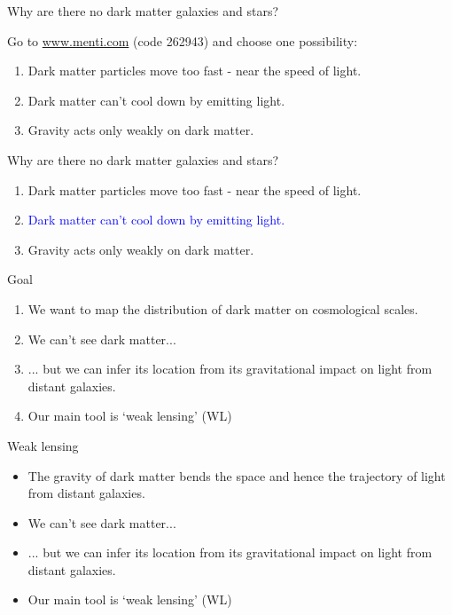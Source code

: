 \documentclass[usenames,dvipsnames]{beamer}
\newcommand{\mentiurl}[0]{{\url{www.menti.com}}}
\newcommand{\menticode}[0]{{262943}}
\newcommand{\correctanswer}[1]{\textcolor{blue}{{#1} \checkmark}}
\begin{document}
\begin{frame}{Why are there no dark matter galaxies and stars?}
  \begin{block}{}
    Go to \mentiurl{} (code \menticode{}) and choose one possibility:\\
    \begin{enumerate}
      \item{Dark matter particles move too fast - near the speed of light.}
      \item{Dark matter can't cool down by emitting light.}
      \item{Gravity acts only weakly on dark matter.}
    \end{enumerate}
  \end{block}
\end{frame}


\begin{frame}{Why are there no dark matter galaxies and stars?}
  \begin{block}{}
    \begin{enumerate}
      \item{Dark matter particles move too fast - near the speed of light.}
      \item{\correctanswer{Dark matter can't cool down by emitting light.}}
      \item{Gravity acts only weakly on dark matter.}
    \end{enumerate}
  \end{block}
\end{frame}

\begin{frame}{Goal}
  \begin{block}{}
    \begin{enumerate}
      \item{We want to map the distribution of dark matter on cosmological scales.}
      \item{We can't see dark matter...}
      \item{... but we can infer its location from its gravitational impact on light from distant galaxies.}
      \item{Our main tool is `weak lensing' (WL)}
    \end{enumerate}
  \end{block}
\end{frame}


\begin{frame}{Weak lensing}
  \begin{block}{}
    \begin{itemize}
      \item{The gravity of dark matter bends the space and hence the trajectory of light from distant galaxies.}
      \item{We can't see dark matter...}
      \item{... but we can infer its location from its gravitational impact on light from distant galaxies.}
      \item{Our main tool is `weak lensing' (WL)}
    \end{itemize}
  \end{block}
\end{frame}
\end{document}
